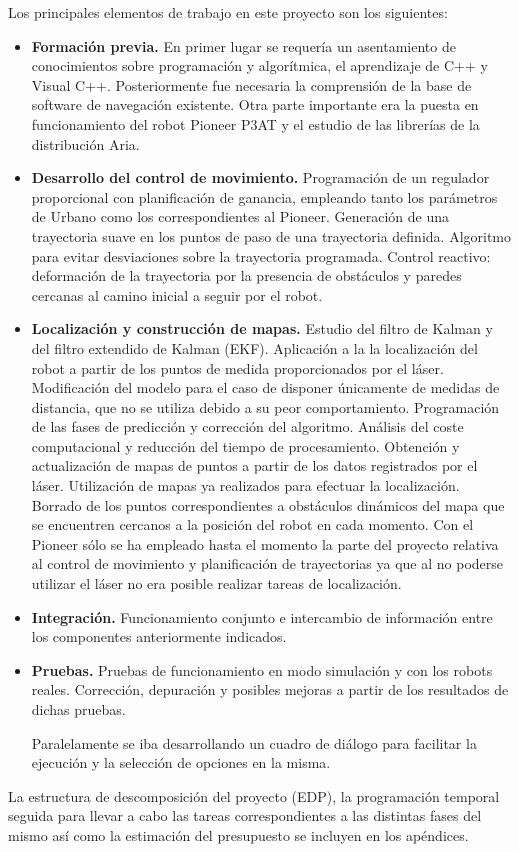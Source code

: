 Los principales elementos de trabajo en este proyecto son los siguientes:
\begin{itemize}
  \item \textbf{Formación previa.} En primer lugar se requería un asentamiento de conocimientos sobre programación y algorítmica, el aprendizaje de C++ y Visual C++. Posteriormente fue necesaria la comprensión de la base de software de navegación existente. Otra parte importante era la puesta en funcionamiento del robot Pioneer P3AT y el estudio de las librerías de la distribución Aria.
  \item \textbf{Desarrollo del control de movimiento.} Programación de un regulador proporcional con planificación de ganancia, empleando tanto los parámetros de Urbano como los correspondientes al Pioneer. Generación de una trayectoria suave en los puntos de paso de una trayectoria definida. Algoritmo para evitar desviaciones sobre la trayectoria programada. Control reactivo: deformación de la trayectoria por la presencia de obstáculos y paredes cercanas al camino inicial a seguir por el robot.
  \item \textbf{Localización y construcción de mapas.} Estudio del filtro de Kalman y del filtro extendido de Kalman (EKF). Aplicación a la la localización del robot a partir de los puntos de medida proporcionados por el láser. Modificación del modelo para el caso de disponer únicamente de medidas de distancia, que no se utiliza debido a su peor comportamiento. Programación de las fases de predicción y corrección del algoritmo. Análisis del coste computacional y reducción del tiempo de procesamiento. Obtención y actualización de mapas de puntos a partir de los datos registrados por el láser. Utilización de mapas ya realizados para efectuar la localización. Borrado de los puntos correspondientes a obstáculos dinámicos del mapa que se encuentren cercanos a la posición del robot en cada momento.
      Con el Pioneer sólo se ha empleado hasta el momento la parte del proyecto relativa al control de movimiento y planificación de trayectorias ya que al no poderse utilizar el láser no era posible realizar tareas de localización.
  \item \textbf{Integración.} Funcionamiento conjunto e intercambio de información entre los componentes anteriormente indicados.
  \item \textbf{Pruebas.} Pruebas de funcionamiento en modo simulación y con los robots reales. Corrección, depuración y posibles mejoras a partir de los resultados de dichas pruebas.

  Paralelamente se iba desarrollando un cuadro de diálogo para facilitar la ejecución y la selección de opciones en la misma.
\end{itemize}

La estructura de descomposición del proyecto (EDP), la programación temporal seguida para llevar a cabo las tareas correspondientes a las distintas fases del mismo así como la estimación del presupuesto se incluyen en los apéndices. 




